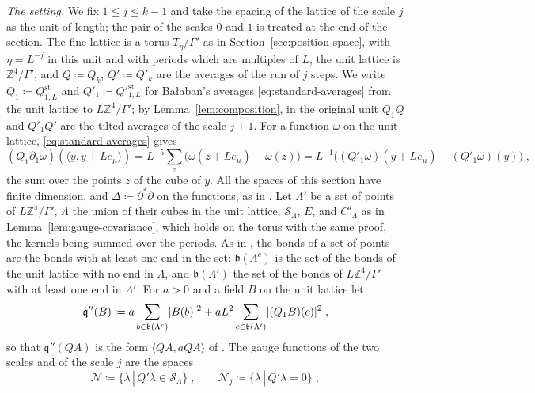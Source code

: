 \documentclass[11pt]{preprint}
\DeclarePairedDelimiter{\abs}{\lvert}{\rvert}
\numberwithin{equation}{section}
\theoremstyle{definition}
\theoremstyle{remark}
\theoremstyle{plain}
\begin{document}
\emph{The setting.} We fix $1 \leq j \leq k - 1$ and take the spacing of the lattice of the scale $j$ as the unit of length; the pair of the scales $0$ and $1$ is treated at the end of the section. The fine lattice is a torus $T_\eta/\Gamma'$ as in Section~\ref{sec:position-space}, with $\eta = L^{-j}$ in this unit and with periods which are multiples of $L$, the unit lattice is $\mathbb Z^4/\Gamma'$, and $Q \coloneqq Q_k$, $Q' \coloneqq Q'_k$ are the averages of the run of $j$ steps. We write $Q_1 \coloneqq Q^{\mathrm{st}}_{1,L}$ and $Q'_1 \coloneqq Q'^{\mathrm{st}}_{1,L}$ for Ba{\l}aban's averages \eqref{eq:standard-averages} from the unit lattice to $L\mathbb Z^4/\Gamma'$; by Lemma~\ref{lem:composition}, in the original unit $Q_1Q$ and $Q'_1Q'$ are the tilted averages of the scale $j + 1$. For a function $\omega$ on the unit lattice, \eqref{eq:standard-averages} gives
\begin{equation}\label{eq:standard-identity}
    (Q_1\partial_1\omega)(\langle y, y + Le_\mu\rangle) = L^{-5}\sum_z\bigl(\omega(z + Le_\mu) - \omega(z)\bigr) = L^{-1}\bigl((Q'_1\omega)(y + Le_\mu) - (Q'_1\omega)(y)\bigr)\;,
\end{equation}
the sum over the points $z$ of the cube of $y$. All the spaces of this section have finite dimension, and $\Delta \coloneqq \partial^*\partial$ on the functions, as in \cite{BalabanPRT2}. Let $\Lambda'$ be a set of points of $L\mathbb Z^4/\Gamma'$, $\Lambda$ the union of their cubes in the unit lattice, $\mathcal S_\Lambda$, $E$, and $C'_\Lambda$ as in Lemma~\ref{lem:gauge-covariance}, which holds on the torus with the same proof, the kernels being summed over the periods. As in \cite[p.~224]{BalabanPRT2}, the bonds of a set of points are the bonds with at least one end in the set: $\mathfrak b(\Lambda^c)$ is the set of the bonds of the unit lattice with no end in $\Lambda$, and $\mathfrak b(\Lambda')$ the set of the bonds of $L\mathbb Z^4/\Gamma'$ with at least one end in $\Lambda'$. For $a > 0$ and a field $B$ on the unit lattice let
\begin{equation}\label{eq:two-scale-average-form}
    \mathfrak q''(B) \coloneqq a\sum_{b \in \mathfrak b(\Lambda^c)}\abs{B(b)}^2 + aL^2\sum_{c \in \mathfrak b(\Lambda')}\abs{(Q_1B)(c)}^2\;,
\end{equation}
so that $\mathfrak q''(QA)$ is the form $\langle QA, aQA\rangle$ of \cite[(2.97)]{BalabanPRT2}. The gauge functions of the two scales and of the scale $j$ are the spaces
\begin{equation}\label{eq:gauge-spaces}
    \mathcal N \coloneqq \{ \lambda \, | \, Q'\lambda \in \mathcal S_\Lambda \}\;,
    \qquad
    \mathcal N_j \coloneqq \{ \lambda \, | \, Q'\lambda = 0 \}\;,
\end{equation}
\end{document}
